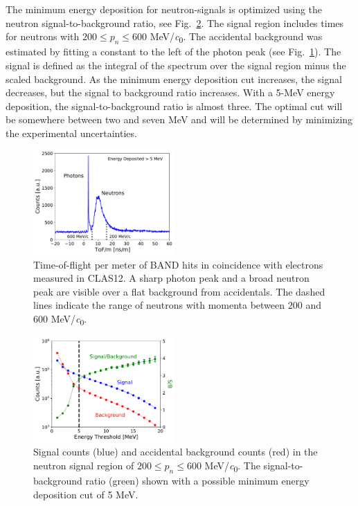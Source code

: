 \documentclass[3p,twocolumn]{elsarticle}
\begin{document}
The minimum energy deposition for neutron-signals is optimized using the neutron
signal-to-background ratio, see Fig.~\ref{fig:signalbackground}. The
signal region includes times for neutrons with $200\le p_n \le600$
\si{\MeV/\clight}. The accidental background was estimated by
fitting a constant to the left of the photon peak (see
Fig.~\ref{fig:tof}). The signal is defined as the integral of the
spectrum over the signal region minus the scaled background.  
As the minimum energy deposition cut increases, the signal decreases,
but the signal to background ratio increases.  
With a 5-\si{\MeV} energy deposition,
the signal-to-background ratio is almost three. The optimal cut will
be somewhere between two and seven \si{\MeV} and will be determined by
minimizing the experimental uncertainties.
\begin{figure}[tbh!]
	\centering
		\includegraphics[width=0.48\textwidth]{fig23-performance.pdf}
                \caption{Time-of-flight per meter of BAND hits in
                  coincidence with electrons measured in
                  CLAS12. A sharp photon peak and a broad neutron peak are visible
                  over a flat background from accidentals. The dashed
                  lines indicate the range of neutrons with momenta
                  between $200$ and $600$ \si{\MeV/\clight}.}
	\label{fig:tof}
\end{figure}

\begin{figure}[tbh!]
	\centering
		\includegraphics[width=0.48\textwidth]{fig24-spb.pdf}
	\caption{Signal counts (blue) and accidental background counts
          (red) in the neutron signal region of $200 \le p_n \le 600$ \si{\MeV/\clight}. The signal-to-background ratio (green) shown with a possible minimum energy deposition cut of 5 \si{\MeV}.}
	\label{fig:signalbackground}
\end{figure}
\end{document}
